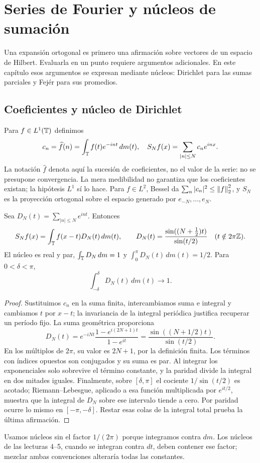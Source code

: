 \chapter{Series de Fourier y núcleos de sumación}\label{cap:v4-03}
Una expansión ortogonal es primero una afirmación sobre vectores de un espacio de Hilbert. Evaluarla en un punto requiere argumentos adicionales. En este capítulo esos argumentos se expresan mediante núcleos: Dirichlet para las sumas parciales y Fejér para sus promedios.

\section{Coeficientes y núcleo de Dirichlet}\label{lectura:v4-04}
Para $f\in L^1(\mathbb T)$ definimos
\[
 c_n=\widehat f(n)=\int_\mathbb T f(t)e^{-int}\,dm(t),\quad
 S_Nf(x)=\sum_{|n|\leq N}c_ne^{inx}.
\]
La notación $\widehat f$ denota aquí la sucesión de coeficientes, no el valor de la serie: no se presupone convergencia. La mera medibilidad no garantiza que los coeficientes existan; la hipótesis $L^1$ sí lo hace. Para $f\in L^2$, Bessel da $\sum_n|c_n|^2\leq\left\lVert f\right\rVert_2^2$, y $S_N$ es la proyección ortogonal sobre el espacio generado por $e_{-N},\ldots,e_N$.
\begin{proposicion}\label{v4:dirichlet}
Sea $D_N(t)=\sum_{|n|\leq N}e^{int}$. Entonces
\[
 S_Nf(x)=\int_\mathbb T f(x-t)D_N(t)\,dm(t),\qquad
 D_N(t)=\frac{\sin((N+\tfrac12)t)}{\sin(t/2)}\quad(t\notin2\pi\mathbb Z).
\]
El núcleo es real y par, $\int_\mathbb T D_N\,dm=1$ y $\int_0^\pi D_N(t)\,dm(t)=1/2$. Para $0<\delta<\pi$,
\[
 \int_{-\delta}^{\delta}D_N(t)\,dm(t)\longrightarrow1.
\]
\end{proposicion}
\begin{proof}
Sustituimos $c_n$ en la suma finita, intercambiamos suma e integral y cambiamos $t$ por $x-t$; la invariancia de la integral periódica justifica recuperar un período fijo. La suma geométrica proporciona
\[
 D_N(t)=e^{-iNt}\frac{1-e^{i(2N+1)t}}{1-e^{it}}
 =\frac{\sin((N+1/2)t)}{\sin(t/2)}.
\]
En los múltiplos de $2\pi$, su valor es $2N+1$, por la definición finita. Los términos con índices opuestos son conjugados y su suma es par. Al integrar los exponenciales solo sobrevive el término constante, y la paridad divide la integral en dos mitades iguales. Finalmente, sobre $[\delta,\pi]$ el cociente $1/\sin(t/2)$ es acotado; Riemann--Lebesgue, aplicado a esa función multiplicada por $e^{it/2}$, muestra que la integral de $D_N$ sobre ese intervalo tiende a cero. Por paridad ocurre lo mismo en $[-\pi,-\delta]$. Restar esas colas de la integral total prueba la última afirmación.
\end{proof}
Usamos núcleos sin el factor $1/(2\pi)$ porque integramos contra $dm$. Los núcleos de las lecturas 4--5, cuando se integran contra $dt$, deben contener ese factor; mezclar ambas convenciones alteraría todas las constantes.

